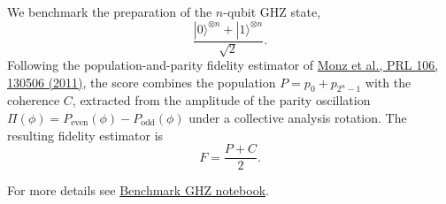 We benchmark the preparation of the \(n\)-qubit GHZ state,
\[
\frac{|0\rangle^{\otimes n} + |1\rangle^{\otimes n}}{\sqrt{2}}.
\]
Following the population-and-parity fidelity estimator of \href{https://link.aps.org/doi/10.1103/PhysRevLett.106.130506}{Monz et al., PRL 106, 130506 (2011)}, the score combines the population \(P = p_0 + p_{2^n-1}\) with the coherence \(C\), extracted from the amplitude of the parity oscillation \(\Pi(\phi) = P_{\mathrm{even}}(\phi) - P_{\mathrm{odd}}(\phi)\) under a collective analysis rotation. The resulting fidelity estimator is
\[
F = \frac{P + C}{2}.
\]
\smallskip

For more details see \href{https://github.com/Classiq/classiq-library/tree/main/benchmarking/benchmarks/benchmark\_ghz.ipynb}{Benchmark GHZ notebook}.
\medskip
